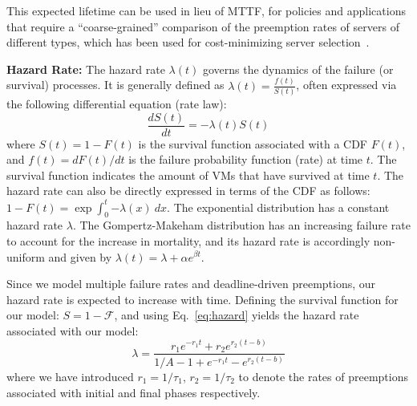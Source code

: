 This expected lifetime can be used in lieu of MTTF, for policies and applications that require a ``coarse-grained'' comparison of the preemption rates of servers of different types, which has been used for cost-minimizing server selection~\cite{flint}. 


\noindent \textbf{Hazard Rate:}
The hazard rate $\lambda(t)$ governs the dynamics of the failure (or survival) processes. It is generally defined as $\lambda(t) = \frac{f(t)}{S(t)}$, often expressed via the following differential equation (rate law):
\begin{equation}\label{eq:hazard}
\frac{dS(t)}{dt} = -\lambda(t) S(t)
\end{equation}
where $S(t) = 1 - F(t)$ is the survival function associated with a CDF $F(t)$, and $f(t)=dF(t)/dt$ is the failure probability function (rate) at time $t$. The survival function indicates the amount of VMs that have survived at time $t$.
The hazard rate can also be directly expressed in terms of the CDF as follows: $1-F(t) = \exp{\int_0^t{-\lambda(x) ~dx}}$. 
The exponential distribution has a constant hazard rate $\lambda$.
The Gompertz-Makeham distribution has an increasing failure rate to account for the increase in mortality, and its hazard rate is accordingly non-uniform and given by $\lambda(t) = \lambda + \alpha e^{\beta t}$.

Since we model multiple failure rates and deadline-driven preemptions, our hazard rate is expected to increase with time. Defining the survival function for our model: $S = 1 - \mathscr{F}$, and using Eq.~\ref{eq:hazard} yields the hazard rate associated with our model: 
\noindent 
\begin{equation}
  \label{eq:hmodel}
  \lambda %
  = \dfrac{r_1 e^{- r_1 t} + r_2 e^{r_2 (t - b)}}{1/A - 1 + e^{- r_1 t} - e^{r_2 (t - b)}}
\end{equation}
where we have introduced $r_1 = 1/\tau_1$, $r_2 = 1/\tau_2$ to denote the rates of preemptions associated with initial and final phases respectively.

